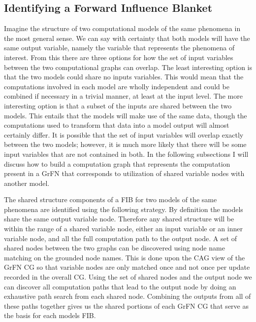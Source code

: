 \subsection{Identifying a Forward Influence Blanket\label{sec:fib_creation}}
Imagine the structure of two computational models of the same phenomena in the most general sense. We can say with certainty that both models will have the same output variable, namely the variable that represents the phenomena of interest. From this there are three options for how the set of input variables between the two computational graphs can overlap. The least interesting option is that the two models could share no inputs variables. This would mean that the computations involved in each model are wholly independent and could be combined if necessary in a trivial manner, at least at the input level. The more interesting option is that a subset of the inputs are shared between the two models. This entails that the models will make use of the same data, though the computations used to transform that data into a model output will almost certainly differ. It is possible that the set of input variables will overlap exactly between the two models; however, it is much more likely that there will be some input variables that are not contained in both. In the following subsections I will discuss how to build a computation graph that represents the computation present in a GrFN that corresponds to utilization of shared variable nodes with another model.

The shared structure components of a FIB for two models of the same phenomena are identified using the following strategy.
By definition the models share the same output variable node.
Therefore any shared structure will be within the range of a shared variable node, either an input variable or an inner variable node, and all the full computation path to the output node.
A set of shared nodes between the two graphs can be discovered using node name matching on the grounded node names.
This is done upon the CAG view of the GrFN CG so that variable nodes are only matched once and not once per update recorded in the overall CG.
Using the set of shared nodes and the output node we can discover all computation paths that lead to the output node by doing an exhaustive path search from each shared node.
Combining the outputs from all of these paths together gives us the shared portions of each GrFN CG that serve as the basis for each models FIB.

